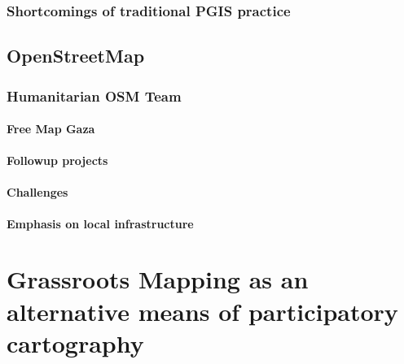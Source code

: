 \documentclass[11pt]{report}
\begin{document}
\subsection{Shortcomings of traditional PGIS practice}
\section{OpenStreetMap}


\subsection{Humanitarian OSM Team}
\subsubsection{Free Map Gaza}
\subsubsection{Followup projects}
\subsubsection{Challenges}
\textbf{Emphasis on local infrastructure}

\chapter{Grassroots Mapping as an alternative means of participatory cartography}
\end{document}
